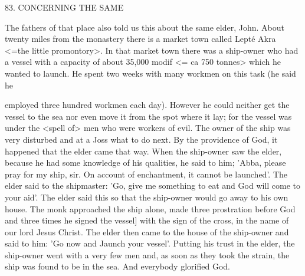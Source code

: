 83.
CONCERNING THE SAME

The fathers of that place also told us this about the same elder,
John.
About twenty miles from the monastery there is a market
town called Lepté Akra <=the little promontory>.
In that market
town there was a ship-owner who had a vessel with a capacity of
about 35,000 modif <= ca 750 tonnes> which he wanted to launch.
He spent two weeks with many workmen on this task (he said he

employed three hundred workmen each day).
However he could
neither get the vessel to the sea nor even move it from the spot
where it lay; for the vessel was under the <spell of> men who were
workers of evil.
The owner of the ship was very disturbed and at a
Joss what to do next.
By the providence of God, it happened that
the elder came that way.
When the ship-owner saw the elder,
because he had some knowledge of his qualities, he said to him;
'Abba, please pray for my ship, sir.
On account of enchantment, it
cannot be launched'.
The elder said to the shipmaster: 'Go, give me
something to eat and God will come to your aid'.
The elder said
this so that the ship-owner would go away to his own house.
The
monk approached the ship alone, made three prostration before
God and three times he signed the vessel] with the sign of the cross,
in the name of our lord Jesus Christ.
The elder then came to the
house of the ship-owner and said to him: 'Go now and Jaunch your
vessel'.
Putting his trust in the elder, the ship-owner went with a
very few men and, as soon as they took the strain, the ship was
found to be in the sea.
And everybody glorified God.

